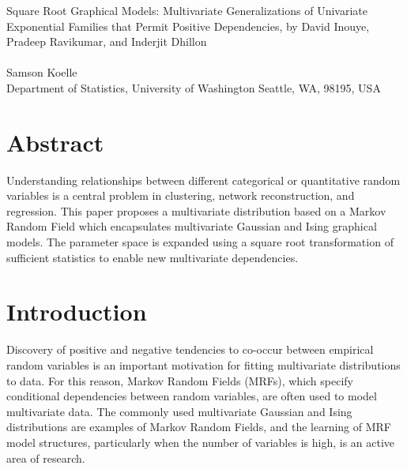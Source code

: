 \documentclass{samkoelleprelimworking}
\begin{document}
\begin{center}  
{\LARGE Square Root Graphical Models: Multivariate Generalizations of
Univariate Exponential Families that Permit Positive Dependencies, by David Inouye, Pradeep Ravikumar, and Inderjit Dhillon}\\\ \\   
 {Samson Koelle \\
    Department of Statistics, University of Washington Seattle, WA, 98195, USA  
     } 
  \end{center}
\section{Abstract}

Understanding relationships between different categorical or quantitative random variables is a central problem in clustering, network reconstruction, and regression.  This paper proposes a multivariate distribution based on a Markov Random Field which encapsulates multivariate Gaussian and Ising graphical models.  The parameter space is expanded using a square root transformation of sufficient statistics to enable new multivariate dependencies.

\section{Introduction} 

Discovery of positive and negative tendencies to co-occur between empirical random variables is an important motivation for fitting multivariate distributions to data.  For this reason, Markov Random Fields (MRFs), which specify conditional dependencies between random variables, are often used to model multivariate data.  The commonly used multivariate Gaussian and Ising distributions are examples of Markov Random Fields, and the learning of MRF model structures, particularly when the number of variables is high, is an active area of research.
\end{document}
